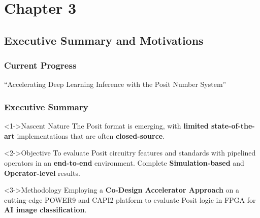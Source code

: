 \graphicspath{{../../../PhD/paper_factory/thesis_louis/Chapter3/Figs/}}

\section{Chapter 3}
\subsection{Executive Summary and Motivations}
\begin{frame}
    \frametitle{Current Progress}

    \centering
    \huge ``Accelerating Deep Learning Inference with the Posit Number System''
    \normalsize

    \vspace{1em} %

    \tableofcontents[currentsection,
                     subsectionstyle=show/shaded/hide,
                     sectionstyle=show/hide]

\end{frame}
\begin{frame}
    \frametitle{Executive Summary}

    \begin{exampleblock}<1->{Nascent Nature}
	    The Posit format is emerging, with \textbf{limited state-of-the-art} implementations that are often \textbf{closed-source}.
    \end{exampleblock}

    \begin{block}<2->{Objective}
	    To evaluate Posit circuitry features and standards with pipelined operators in an \textbf{end-to-end} environment.
	    Complete \textbf{Simulation-based} and \textbf{Operator-level} results.
    \end{block}

    \begin{alertblock}<3->{Methodology}
	    Employing a \textbf{Co-Design Accelerator Approach} on a cutting-edge POWER9 and CAPI2 platform to evaluate Posit logic in FPGA for \textbf{AI image classification}.
    \end{alertblock}

\end{frame}

